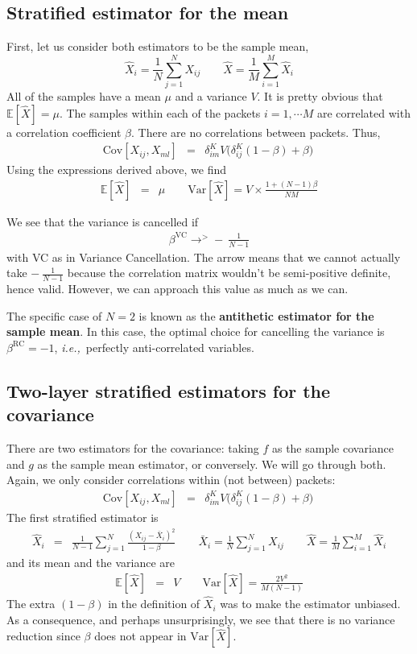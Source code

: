 \documentclass{aastex6}
\newcommand{\ie}{{\textit{i.e.,}~}}
\newcommand{\equ}[1]{\begin{equation}#1\end{equation}}
\newcommand{\eqn}[1]{\begin{eqnarray}#1\end{eqnarray}}
\begin{document}
\subsection{Stratified estimator for the mean}

First, let us consider both estimators to be the sample mean,
\equ{
	\hat{X}_i = \frac{1}{N}\sum_{j=1}^N X_{ij}  \quad\quad \hat{X} =  \frac{1}{M}\sum_{i=1}^M \hat{X}_i 
	}
All of the samples have a mean $\mu$ and a variance $V$. It is pretty obvious that $\mathbb{E}[\hat{X}] = \mu$.
The samples within each of the packets $i=1, \cdots M$ are correlated with a correlation coefficient $\beta$. 
There are no correlations between packets. Thus,
\eqn{
	\mathrm{Cov}[X_{ij}, X_{ml}] &=& \delta^K_{im} V \bigl(\delta^K_{ij}(1-\beta) + \beta\bigr) \ 
}
Using the expressions derived above, we find
\eqn{
	\mathbb{E}[\hat{X}] &=& \mu\quad\quad
	\mathrm{Var}[\hat{X}] =  V \times \frac{1 + (N-1)\beta}{N M}
}

We see that the variance is cancelled if 
\eqn{
	\beta^\mathrm{VC} \rightarrow^{>} - \ \frac{1}{N-1}
}
with VC as in Variance Cancellation. The arrow means that we cannot actually take $- \ \frac{1}{N-1}$ because the correlation matrix wouldn't be semi-positive definite, hence valid. However, we can approach this value as much as we can.

The specific case of $N=2$ is known as the \textbf{antithetic estimator for the sample mean}. In this case, the optimal choice for cancelling the variance is $\beta^\mathrm{RC}=-1$, \ie perfectly anti-correlated variables. 

\subsection{Two-layer stratified estimators for the covariance}

There are two estimators for the covariance: taking $f$ as the sample covariance and $g$ as the sample mean estimator, or conversely. We will go through both. Again, we only consider correlations within (not between) packets:
\eqn{
	\mathrm{Cov}[X_{ij}, X_{ml}] &=& \delta^K_{im} V \bigl(\delta^K_{ij}(1-\beta) + \beta\bigr) \ 
}
The first stratified estimator is
\eqn{
	\hat{X}_i &=& \frac{1}{N-1}\sum_{j=1}^N \frac{(X_{ij} - \bar{X}_{i})^2}{1-\beta}	\quad\quad \bar{X}_{i}	=  \frac{1}{N}\sum_{j=1}^N X_{ij}	\quad\quad \hat{X} =  \frac{1}{M}\sum_{i=1}^M \hat{X}_i 
}
and its mean and the variance are
\eqn{
	\mathbb{E}[\hat{X}] 	&=&	V 	\quad \quad\mathrm{Var}[\hat{X}] = \frac{2V^2}{M(N-1)} 
}
The extra $ (1-\beta)$ in the definition of $\hat{X}_i$ was to make the estimator unbiased. As a consequence, and perhaps unsurprisingly, we see that there is no variance reduction since $\beta$ does not appear in $\mathrm{Var}[\hat{X}]$.
\end{document}
